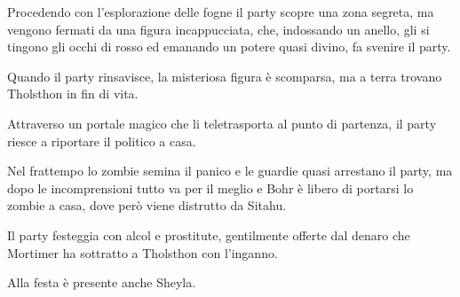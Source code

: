 Procedendo con l'esplorazione delle fogne il party scopre una zona
segreta, ma vengono fermati da una figura incappucciata, che, indossando
un anello, gli si tingono gli occhi di rosso ed emanando un potere quasi
divino, fa svenire il party.

Quando il party rinsavisce, la misteriosa figura è scomparsa, ma a terra
trovano Tholsthon in fin di vita.

Attraverso un portale magico che li teletrasporta al punto di partenza,
il party riesce a riportare il politico a casa.

Nel frattempo lo zombie semina il panico e le guardie quasi arrestano il
party, ma dopo le incomprensioni tutto va per il meglio e Bohr è libero
di portarsi lo zombie a casa, dove però viene distrutto da Sitahu.

Il party festeggia con alcol e prostitute, gentilmente offerte dal
denaro che Mortimer ha sottratto a Tholsthon con l'inganno.

Alla festa è presente anche Sheyla.
